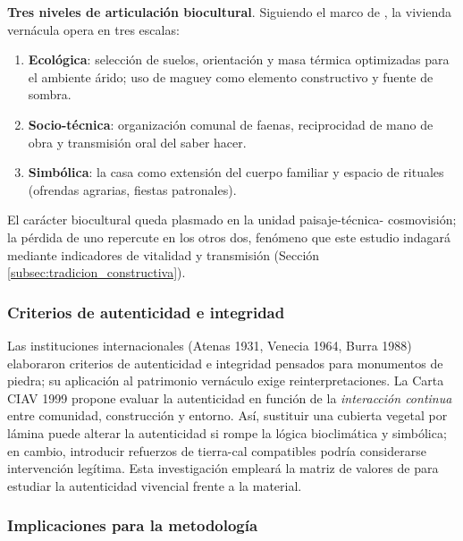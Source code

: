 \textbf{Tres niveles de articulación biocultural}. Siguiendo el marco de \cite{gudynas2010desarrollo}, la vivienda
vernácula opera en tres escalas:

\begin{enumerate}
	\item \textbf{Ecológica}: selección de suelos, orientación y masa
	      térmica optimizadas para el ambiente árido; uso de maguey como
	      elemento constructivo y fuente de sombra.

	\item \textbf{Socio-técnica}: organización comunal de faenas,
	      reciprocidad de mano de obra y transmisión oral del saber hacer.

	\item \textbf{Simbólica}: la casa como extensión del cuerpo familiar
	      y espacio de rituales (ofrendas agrarias, fiestas patronales).
\end{enumerate}

El carácter biocultural queda plasmado en la unidad paisaje-técnica-
cosmovisión; la pérdida de uno repercute en los otros dos, fenómeno que
este estudio indagará mediante indicadores de vitalidad y
transmisión (Sección \ref{subsec:tradicion_constructiva}).

\subsubsection{Criterios de autenticidad e integridad}

Las instituciones internacionales (Atenas 1931, Venecia 1964,
Burra 1988) elaboraron criterios de autenticidad e integridad pensados
para monumentos de piedra; su aplicación al patrimonio vernáculo exige
reinterpretaciones.  La Carta CIAV 1999 propone evaluar la autenticidad
en función de la \emph{interacción continua} entre comunidad,
construcción y entorno.\citep{corbusier1931carta,venecia1964card,burra1988}  Así, sustituir una cubierta vegetal por lámina
puede alterar la autenticidad si rompe la lógica bioclimática y
simbólica; en cambio, introducir refuerzos de tierra-cal compatibles
podría considerarse intervención legítima.  Esta investigación
empleará la matriz de valores de \cite{delatorre2002values} para
estudiar la autenticidad vivencial frente a la material.

\subsubsection{Implicaciones para la metodología}


